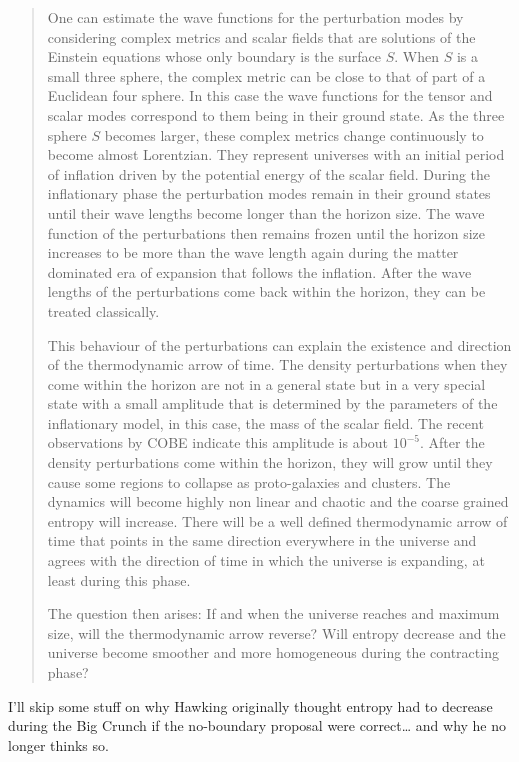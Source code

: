 \documentclass[12pt]{article}
\begin{document}
\begin{quote}

One can estimate the wave functions for the perturbation modes by
considering complex metrics and scalar fields that are solutions of the
Einstein equations whose only boundary is the surface \(S\). When \(S\)
is a small three sphere, the complex metric can be close to that of part
of a Euclidean four sphere. In this case the wave functions for the
tensor and scalar modes correspond to them being in their ground state.
As the three sphere \(S\) becomes larger, these complex metrics change
continuously to become almost Lorentzian. They represent universes with
an initial period of inflation driven by the potential energy of the
scalar field. During the inflationary phase the perturbation modes
remain in their ground states until their wave lengths become longer
than the horizon size. The wave function of the perturbations then
remains frozen until the horizon size increases to be more than the wave
length again during the matter dominated era of expansion that follows
the inflation. After the wave lengths of the perturbations come back
within the horizon, they can be treated classically.

This behaviour of the perturbations can explain the existence and
direction of the thermodynamic arrow of time. The density perturbations
when they come within the horizon are not in a general state but in a
very special state with a small amplitude that is determined by the
parameters of the inflationary model, in this case, the mass of the
scalar field. The recent observations by COBE indicate this amplitude is
about \(10^{-5}\). After the density perturbations come within the
horizon, they will grow until they cause some regions to collapse as
proto-galaxies and clusters. The dynamics will become highly non linear
and chaotic and the coarse grained entropy will increase. There will be
a well defined thermodynamic arrow of time that points in the same
direction everywhere in the universe and agrees with the direction of
time in which the universe is expanding, at least during this phase.

The question then arises: If and when the universe reaches and maximum
size, will the thermodynamic arrow reverse? Will entropy decrease and
the universe become smoother and more homogeneous during the contracting
phase?

\end{quote}

\noindent
I'll skip some stuff on why Hawking originally thought entropy had to
decrease during the Big Crunch if the no-boundary proposal were
correct\ldots{} and why he no longer thinks so.
\end{document}
